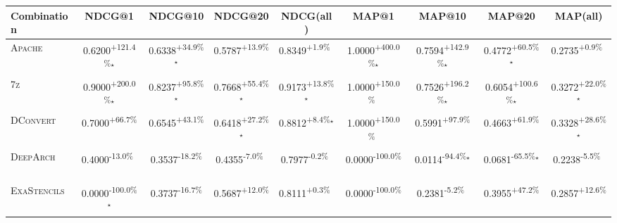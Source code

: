 \begin{table}[htbp]
\centering
\renewcommand{\arraystretch}{1.2}
\begin{tabular}{l|cccc|cccc}
\hline
Combination & NDCG@1 & NDCG@10 & NDCG@20 & NDCG(all) & MAP@1 & MAP@10 & MAP@20 & MAP(all) \\ \hline
\textsc{Apache} & \cellcolor{green!30}0.6200\textsuperscript{+121.4\%}$^\star$ & \cellcolor{green!30}0.6338\textsuperscript{+34.9\%}$^\star$ & \cellcolor{green!30}0.5787\textsuperscript{+13.9\%}$^{\,\,\,}$ & \cellcolor{green!30}0.8349\textsuperscript{+1.9\%}$^{\,\,\,}$ & \cellcolor{green!30}1.0000\textsuperscript{+400.0\%}$^\star$ & \cellcolor{green!30}0.7594\textsuperscript{+142.9\%}$^\star$ & \cellcolor{green!30}0.4772\textsuperscript{+60.5\%}$^\star$ & \cellcolor{green!30}0.2735\textsuperscript{+0.9\%}$^{\,\,\,}$ \\
\textsc{7z} & \cellcolor{green!30}0.9000\textsuperscript{+200.0\%}$^\star$ & \cellcolor{green!30}0.8237\textsuperscript{+95.8\%}$^\star$ & \cellcolor{green!30}0.7668\textsuperscript{+55.4\%}$^\star$ & \cellcolor{green!30}0.9173\textsuperscript{+13.8\%}$^\star$ & \cellcolor{green!30}1.0000\textsuperscript{+150.0\%}$^{\,\,\,}$ & \cellcolor{green!30}0.7526\textsuperscript{+196.2\%}$^\star$ & \cellcolor{green!30}0.6054\textsuperscript{+100.6\%}$^\star$ & \cellcolor{green!30}0.3272\textsuperscript{+22.0\%}$^\star$ \\
\textsc{DConvert} & \cellcolor{green!30}0.7000\textsuperscript{+66.7\%}$^{\,\,\,}$ & \cellcolor{green!30}0.6545\textsuperscript{+43.1\%}$^{\,\,\,}$ & \cellcolor{green!30}0.6418\textsuperscript{+27.2\%}$^\star$ & \cellcolor{green!30}0.8812\textsuperscript{+8.4\%}$^\star$ & \cellcolor{green!30}1.0000\textsuperscript{+150.0\%}$^{\,\,\,}$ & \cellcolor{green!30}0.5991\textsuperscript{+97.9\%}$^{\,\,\,}$ & \cellcolor{green!30}0.4663\textsuperscript{+61.9\%}$^{\,\,\,}$ & \cellcolor{green!30}0.3328\textsuperscript{+28.6\%}$^\star$ \\
\textsc{DeepArch} & \cellcolor{red!30}0.4000\textsuperscript{-13.0\%}$^{\,\,\,}$ & \cellcolor{red!30}0.3537\textsuperscript{-18.2\%}$^{\,\,\,}$ & \cellcolor{red!30}0.4355\textsuperscript{-7.0\%}$^{\,\,\,}$ & \cellcolor{red!30}0.7977\textsuperscript{-0.2\%}$^{\,\,\,}$ & \cellcolor{red!30}0.0000\textsuperscript{-100.0\%}$^{\,\,\,}$ & \cellcolor{red!30}0.0114\textsuperscript{-94.4\%}$^\star$ & \cellcolor{red!30}0.0681\textsuperscript{-65.5\%}$^\star$ & \cellcolor{red!30}0.2238\textsuperscript{-5.5\%}$^{\,\,\,}$ \\
\textsc{ExaStencils} & \cellcolor{red!30}0.0000\textsuperscript{-100.0\%}$^\star$ & \cellcolor{red!30}0.3737\textsuperscript{-16.7\%}$^{\,\,\,}$ & \cellcolor{green!30}0.5687\textsuperscript{+12.0\%}$^{\,\,\,}$ & \cellcolor{green!30}0.8111\textsuperscript{+0.3\%}$^{\,\,\,}$ & \cellcolor{red!30}0.0000\textsuperscript{-100.0\%}$^{\,\,\,}$ & \cellcolor{red!30}0.2381\textsuperscript{-5.2\%}$^{\,\,\,}$ & \cellcolor{green!30}0.3955\textsuperscript{+47.2\%}$^{\,\,\,}$ & \cellcolor{green!30}0.2857\textsuperscript{+12.6\%}$^{\,\,\,}$ \\

\end{tabular}
\end{table}
